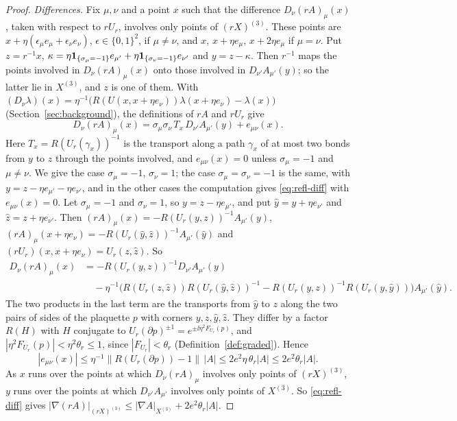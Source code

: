 \begin{proof}
\emph{Differences.} Fix $\mu,\nu$ and a point $x$ such that the difference $D_\nu(rA)_\mu(x)$, taken with respect to $rU_r$, involves only points of $(rX)^{(3)}$. These points are $x+\eta(\epsilon_\mu e_\mu+\epsilon_\nu e_\nu)$, $\epsilon\in\{0,1\}^2$, if $\mu\ne\nu$, and $x$, $x+\eta e_\mu$, $x+2\eta e_\mu$ if $\mu=\nu$. Put $z=r^{-1}x$, $\kappa=\eta\mathbf 1_{\{\sigma_\mu=-1\}}e_{\mu'}+\eta\mathbf 1_{\{\sigma_\nu=-1\}}e_{\nu'}$ and $y=z-\kappa$. Then $r^{-1}$ maps the points involved in $D_\nu(rA)_\mu(x)$ onto those involved in $D_{\nu'}A_{\mu'}(y)$; so the latter lie in $X^{(3)}$, and $z$ is one of them. With $(D_\nu\lambda)(x)=\eta^{-1}\big(R(U(x,x+\eta e_\nu))\lambda(x+\eta e_\nu)-\lambda(x)\big)$ (Section~\ref{sec:background}), the definitions of $rA$ and $rU_r$ give
\begin{equation}\label{eq:refl-diff}
D_\nu(rA)_\mu(x)=\sigma_\mu\sigma_\nu\,T_x\,D_{\nu'}A_{\mu'}(y)+e_{\mu\nu}(x).
\end{equation}
Here $T_x=R(U_r(\gamma_x))^{-1}$ is the transport along a path $\gamma_x$ of at most two bonds from $y$ to $z$ through the points involved, and $e_{\mu\nu}(x)=0$ unless $\sigma_\mu=-1$ and $\mu\ne\nu$. We give the case $\sigma_\mu=-1$, $\sigma_\nu=1$; the case $\sigma_\mu=\sigma_\nu=-1$ is the same, with $y=z-\eta e_{\mu'}-\eta e_{\nu'}$, and in the other cases the computation gives \eqref{eq:refl-diff} with $e_{\mu\nu}(x)=0$. Let $\sigma_\mu=-1$ and $\sigma_\nu=1$, so $y=z-\eta e_{\mu'}$, and put $\hat y=y+\eta e_{\nu'}$ and $\hat z=z+\eta e_{\nu'}$. Then $(rA)_\mu(x)=-R(U_r(y,z))^{-1}A_{\mu'}(y)$, $(rA)_\mu(x+\eta e_\nu)=-R(U_r(\hat y,\hat z))^{-1}A_{\mu'}(\hat y)$ and $(rU_r)(x,x+\eta e_\nu)=U_r(z,\hat z)$. So
\[
\begin{aligned}
D_\nu(rA)_\mu(x)&=-R(U_r(y,z))^{-1}D_{\nu'}A_{\mu'}(y)\\
&\quad-\eta^{-1}\Big(R(U_r(z,\hat z))R(U_r(\hat y,\hat z))^{-1}-R(U_r(y,z))^{-1}R(U_r(y,\hat y))\Big)A_{\mu'}(\hat y).
\end{aligned}
\]
The two products in the last term are the transports from $\hat y$ to $z$ along the two pairs of sides of the plaquette $p$ with corners $y,z,\hat y,\hat z$. They differ by a factor $R(H)$ with $H$ conjugate to $U_r(\partial p)^{\pm1}=e^{\pm\ii\eta^2F_{U_r}(p)}$, and $|\eta^2F_{U_r}(p)|<\eta^2\theta_r\le1$, since $|F_{U_r}|<\theta_r$ (Definition~\ref{def:graded}). Hence
\[
|e_{\mu\nu}(x)|\le\eta^{-1}\|R(U_r(\partial p))-1\|\,|A|\le2e^2\eta\,\theta_r|A|\le2e^2\theta_r|A| .
\]
As $x$ runs over the points at which $D_\nu(rA)_\mu$ involves only points of $(rX)^{(3)}$, $y$ runs over the points at which $D_{\nu'}A_{\mu'}$ involves only points of $X^{(3)}$. So \eqref{eq:refl-diff} gives $|\nabla(rA)|_{(rX)^{(3)}}\le|\nabla A|_{X^{(3)}}+2e^2\theta_r|A|$.


\end{proof}
